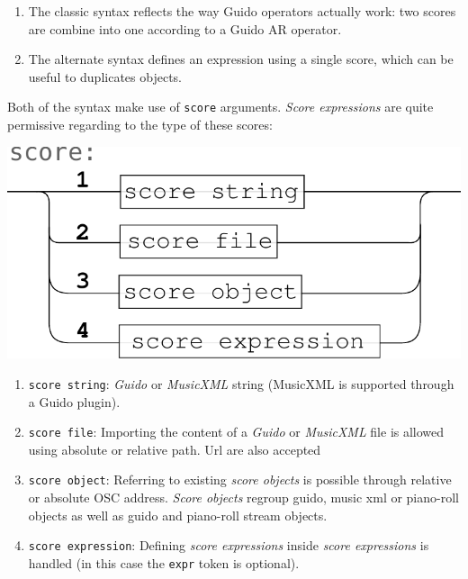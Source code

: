 \documentclass{article}
\newcommand{\OSC}[1]{\texttt{#1}}
\newcommand{\sExpr}{\emph{score expressions} }
\newcommand{\SExpr}{\emph{Score expressions} }
\begin{document}
\begin{enumerate}
\item The classic syntax reflects the way Guido operators actually work: two scores are combine into one according to a Guido AR operator.
\item The alternate syntax defines an expression using a single score, which can be useful to duplicates objects.
\end{enumerate}

\smallbreak

Both of the syntax make use of \OSC{score} arguments. \SExpr are quite permissive regarding to the type of these scores:
\begin{center}
\includegraphics[width=0.7\columnwidth]{imgs/syntax2}
\end{center}

\begin{enumerate}
\item \OSC{score string}: \emph{Guido} or \emph{MusicXML} string (MusicXML is supported through a Guido plugin).
\item \OSC{score file}:  Importing  the content of a \emph{Guido} or \emph{MusicXML} file is allowed using absolute or relative path. Url are also accepted
\item \OSC{score object}:  Referring to existing \emph{score objects} is possible through relative or absolute OSC address. \emph{Score objects} regroup guido, music xml or piano-roll objects as well as guido and piano-roll stream objects.
\item \OSC{score expression}:  Defining \sExpr inside \sExpr is handled (in this case the \OSC{expr} token is optional).
\end{enumerate}

\end{document}
